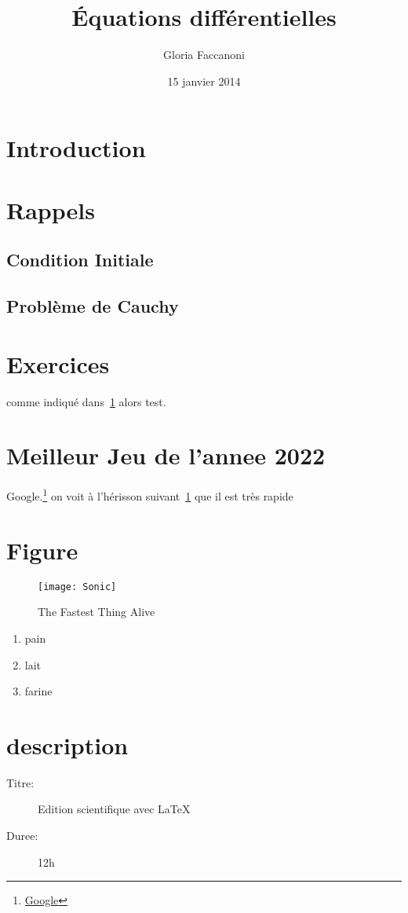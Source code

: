 \documentclass[10pt,a4paper]{scrartcl}
\title{Équations différentielles}
\author{Gloria Faccanoni}
\date{15 janvier 2014}
\begin{document}
\maketitle
\lipsum[10]
\tableofcontents
\section*{Introduction}
\lipsum[1-2]
\section{Rappels}\label{rapp}
\lipsum[3]
\subsection{Condition Initiale}
\lipsum[4]
\subsection{Problème de Cauchy}
\lipsum[5]
\section{Exercices}
\lipsum[6]
comme indiqué dans~\ref{rapp} alors test.
\section{Meilleur Jeu de l'annee 2022}
Google.\footnote{\href{http://www.google.com}{Google}}
on voit à l'hérisson suivant~\ref{fig.Sonic} que il est très rapide
\section{Figure}
\begin{figure}
\centering
\texttt{[image: Sonic]}
\caption{The Fastest Thing Alive}\label{fig.Sonic}
\end{figure}
\lipsum[2]
\begin{enumerate}
\item pain
\item lait
\item farine
\end{enumerate}
\section{description}
\begin{description}
\item[Titre:]Edition scientifique avec \LaTeX
\item[Duree:]12h
\end{description}
\end{document}
